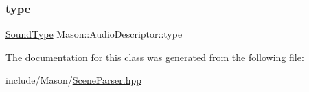 \hypertarget{class_mason_1_1_audio_descriptor_af0235fd20741197930246f28acb5113b}{}\label{class_mason_1_1_audio_descriptor_af0235fd20741197930246f28acb5113b} 
\subsubsection{\texorpdfstring{type}{type}}
{\footnotesize\ttfamily \hyperlink{namespace_mason_a158d651086d1ba1aacc4c37125b27657}{Sound\+Type} Mason\+::\+Audio\+Descriptor\+::type}



The documentation for this class was generated from the following file\+:\begin{DoxyCompactItemize}
\item 
include/\+Mason/\hyperlink{_scene_parser_8hpp}{Scene\+Parser.\+hpp}\end{DoxyCompactItemize}
